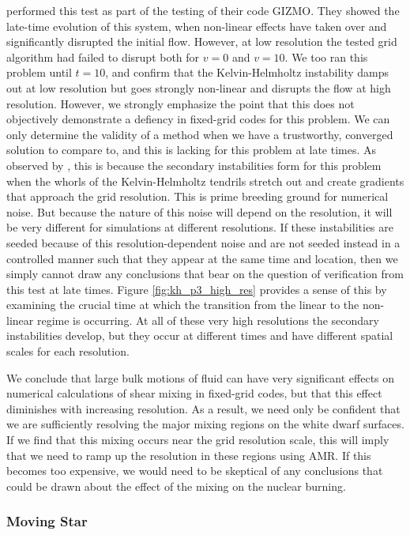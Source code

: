 \documentclass[iop]{emulateapj}
\begin{document}
\citet{hopkins:2014} performed this test as part of the testing of their code GIZMO. 
They showed the late-time evolution of this system, when non-linear effects have 
taken over and significantly disrupted the initial flow. However, at low resolution the 
tested grid algorithm had failed to disrupt both for $v = 0$ and $v = 10$. We too ran 
this problem until $t = 10$, and confirm that the Kelvin-Helmholtz instability damps out 
at low resolution but goes strongly non-linear and disrupts the flow at high resolution.
However, we strongly emphasize the point that this does not objectively 
demonstrate a defiency in fixed-grid codes for this problem. We can only determine 
the validity of a method when we have a trustworthy, converged solution to compare to, and 
this is lacking for this problem at late times. As observed by \citeauthor{mcnally:2012}, 
this is because the secondary instabilities form for this problem when the whorls of 
the Kelvin-Helmholtz tendrils stretch out and create gradients that approach the 
grid resolution. This is prime breeding ground for numerical noise. But because 
the nature of this noise will depend on the resolution, it will be very different for 
simulations at different resolutions. If these instabilities are seeded because of 
this resolution-dependent noise and are not seeded instead in a controlled manner 
such that they appear at the same time and location, then we simply cannot draw 
any conclusions that bear on the question of verification from this test at late times. 
Figure \ref{fig:kh_p3_high_res} provides a sense of this by examining the crucial 
time at which the transition from the linear to the non-linear regime is occurring. 
At all of these very high resolutions the secondary instabilities develop, but they 
occur at different times and have different spatial scales for each resolution.

We conclude that large bulk motions of fluid can have very significant effects 
on numerical calculations of shear mixing in fixed-grid codes, but that this effect 
diminishes with increasing resolution. As a result, we need only be confident that we are 
sufficiently resolving the major mixing regions on the white dwarf surfaces. 
If we find that this mixing occurs near the grid resolution scale, this will imply 
that we need to ramp up the resolution in these regions using AMR. If this becomes 
too expensive, we would need to be skeptical of any conclusions that could be drawn 
about the effect of the mixing on the nuclear burning.

\subsubsection{Moving Star}\label{sed:moving_star}
\end{document}
